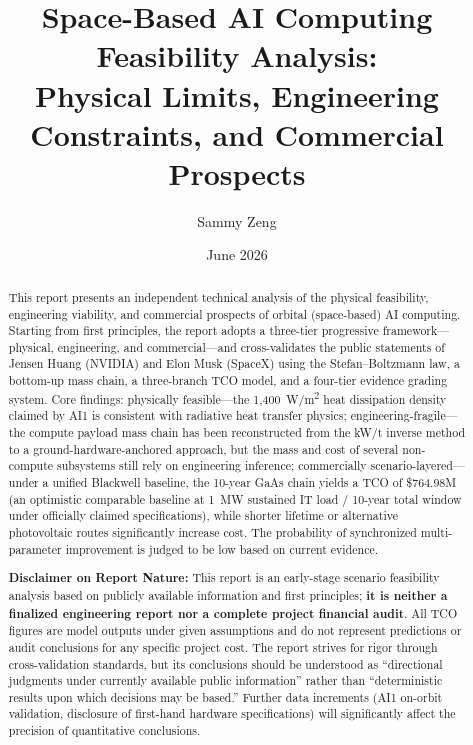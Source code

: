 \documentclass[12pt,a4paper]{article}
\title{Space-Based AI Computing Feasibility Analysis:\\
Physical Limits, Engineering Constraints, and Commercial Prospects}
\author{Sammy Zeng}
\date{June 2026}
\begin{document}
\maketitle

\renewcommand{\thefootnote}{\arabic{footnote}}

\begin{abstract}
This report presents an independent technical analysis of the physical feasibility, engineering viability, and commercial prospects of orbital (space-based) AI computing. Starting from first principles, the report adopts a three-tier progressive framework---physical, engineering, and commercial---and cross-validates the public statements of Jensen Huang (NVIDIA) and Elon Musk (SpaceX) using the Stefan--Boltzmann law, a bottom-up mass chain, a three-branch TCO model, and a four-tier evidence grading system. Core findings: physically feasible---the 1,400~W/m\textsuperscript{2} heat dissipation density claimed by AI1 is consistent with radiative heat transfer physics; engineering-fragile---the compute payload mass chain has been reconstructed from the kW/t inverse method to a ground-hardware-anchored approach, but the mass and cost of several non-compute subsystems still rely on engineering inference; commercially scenario-layered---under a unified Blackwell baseline, the 10-year GaAs chain yields a TCO of \$764.98M (an optimistic comparable baseline at 1~MW sustained IT load / 10-year total window under officially claimed specifications), while shorter lifetime or alternative photovoltaic routes significantly increase cost. The probability of synchronized multi-parameter improvement is judged to be low based on current evidence.

\medskip
\noindent\textbf{Disclaimer on Report Nature:} This report is an early-stage scenario feasibility analysis based on publicly available information and first principles; \textbf{it is neither a finalized engineering report nor a complete project financial audit}. All TCO figures are model outputs under given assumptions and do not represent predictions or audit conclusions for any specific project cost. The report strives for rigor through cross-validation standards, but its conclusions should be understood as ``directional judgments under currently available public information'' rather than ``deterministic results upon which decisions may be based.'' Further data increments (AI1 on-orbit validation, disclosure of first-hand hardware specifications) will significantly affect the precision of quantitative conclusions.
\end{abstract}
\end{document}
